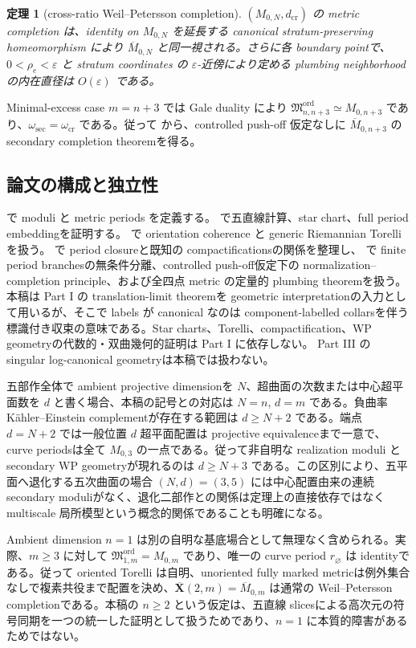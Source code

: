 \documentclass[11pt,a4paper]{ltjsarticle}
\newcommand{\ov}{\overline}
\newcommand{\Mord}{\mathfrak M^{\mathrm{ord}}}
\theoremstyle{plain}
\newtheorem{theorem}{定理}[section]
\theoremstyle{definition}
\theoremstyle{remark}
\begin{document}
\begin{theorem}[cross-ratio Weil--Petersson completion]
\label{thm:intro-wp}
$(M_{0,N},d_{\mathrm{cr}})$ の metric completion は、identity on $M_{0,N}$ を延長する canonical stratum-preserving homeomorphism により $\ov M_{0,N}$ と同一視される。さらに各 boundary pointで、$0<\rho_e<\varepsilon$ と stratum coordinates の $\varepsilon$-近傍により定める plumbing neighborhoodの内在直径は $O(\varepsilon)$ である。
\end{theorem}

Minimal-excess case $m=n+3$ では Gale duality により $\Mord_{n,n+3}\simeq M_{0,n+3}$ であり、$\omega_{\mathrm{sec}}=\omega_{\mathrm{cr}}$ である。従って  から、controlled push-off 仮定なしに $\ov M_{0,n+3}$ の secondary completion theoremを得る。

\subsection{論文の構成と独立性}
 で moduli と metric periods を定義する。
 で五直線計算、star chart、full period embeddingを証明する。
 で orientation coherence と generic Riemannian Torelliを扱う。
 で period closureと既知の compactificationsの関係を整理し、 で finite period branchesの無条件分離、controlled push-off仮定下の normalization--completion principle、および全四点 metric の定量的 plumbing theoremを扱う。
本稿は Part I の translation-limit theoremを geometric interpretationの入力として用いるが、そこで labels が canonical なのは component-labelled collarsを伴う標識付き収束の意味である。Star charts、Torelli、compactification、WP geometryの代数的・双曲幾何的証明は Part I に依存しない。
Part III の singular log-canonical geometryは本稿では扱わない。

五部作全体で ambient projective dimensionを $N$、超曲面の次数または中心超平面数を $d$ と書く場合、本稿の記号との対応は $N=n$, $d=m$ である。負曲率 K\"ahler--Einstein complementが存在する範囲は $d\ge N+2$ である。端点 $d=N+2$ では一般位置 $d$ 超平面配置は projective equivalenceまで一意で、curve periodsは全て $M_{0,3}$ の一点である。従って非自明な realization moduli と secondary WP geometryが現れるのは $d\ge N+3$ である。この区別により、五平面へ退化する五次曲面の場合 $(N,d)=(3,5)$ には中心配置由来の連続 secondary moduliがなく、退化二部作との関係は定理上の直接依存ではなく multiscale 局所模型という概念的関係であることも明確になる。

Ambient dimension $n=1$ は別の自明な基底場合として無理なく含められる。実際、$m\ge3$ に対して $\Mord_{1,m}=M_{0,m}$ であり、唯一の curve period $r_\varnothing$ は identityである。従って oriented Torelli は自明、unoriented fully marked metricは例外集合なしで複素共役まで配置を決め、$\ov{\mathbf X}(2,m)=\ov M_{0,m}$ は通常の Weil--Petersson completionである。本稿の $n\ge2$ という仮定は、五直線 slicesによる高次元の符号同期を一つの統一した証明として扱うためであり、$n=1$ に本質的障害があるためではない。
\end{document}

